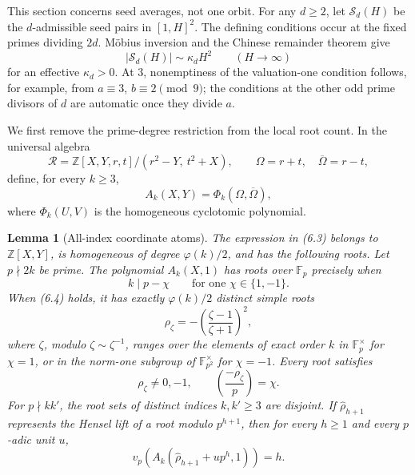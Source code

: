 \documentclass[11pt]{article}
\newtheorem{lemma}[theorem]{Lemma}
\theoremstyle{definition}
\theoremstyle{remark}
\newcommand{\Sset}{\mathcal S}
\begin{document}
This section concerns seed averages, not one orbit.  For any $d\ge2$,
let \(\Sset_d(H)\) be the $d$-admissible seed pairs in \([1,H]^2\).
The defining conditions occur at the fixed primes dividing $2d$.
Möbius inversion and the Chinese remainder theorem give
\[
 |\Sset_d(H)|\sim\kappa_dH^2
 \qquad(H\longrightarrow\infty)
 \tag{6.1}
\]
for an effective \(\kappa_d>0\).  At $3$, nonemptiness of the
valuation-one condition follows, for example, from
\(a\equiv3\), \(b\equiv2\pmod9\); the conditions at the other odd
prime divisors of $d$ are automatic once they divide $a$.

We first remove the prime-degree restriction from the local root count.
In the universal algebra
\[
 \mathcal R=\mathbb Z[X,Y,r,t]/(r^2-Y,\ t^2+X),
 \qquad
 \Omega=r+t,\quad\overline\Omega=r-t,
 \tag{6.2}
\]
define, for every $k\ge3$,
\[
 A_k(X,Y)=\Phi_k(\Omega,\overline\Omega),
 \tag{6.3}
\]
where \(\Phi_k(U,V)\) is the homogeneous cyclotomic polynomial.

\begin{lemma}[All-index coordinate atoms]\label{lem:all-index-atoms}
The expression in (6.3) belongs to \(\mathbb Z[X,Y]\), is homogeneous
of degree \(\varphi(k)/2\), and has the following roots.  Let
\(p\nmid2k\) be prime.  The polynomial \(A_k(X,1)\) has roots over
\(\mathbb F_p\) precisely when
\[
 k\mid p-\chi\qquad\text{for one }\chi\in\{1,-1\}.
 \tag{6.4}
\]
When (6.4) holds, it has exactly \(\varphi(k)/2\) distinct simple
roots
\[
 \rho_\zeta=-\left(\frac{\zeta-1}{\zeta+1}\right)^2,
 \tag{6.5}
\]
where \(\zeta\), modulo \(\zeta\sim\zeta^{-1}\), ranges over the
elements of exact order $k$ in \(\mathbb F_p^\times\) for \(\chi=1\),
or in the norm-one subgroup of \(\mathbb F_{p^2}^\times\) for
\(\chi=-1\).  Every root satisfies
\[
 \rho_\zeta\ne0,-1,
 \qquad
 \left(\frac{-\rho_\zeta}{p}\right)=\chi.
 \tag{6.6}
\]
For \(p\nmid kk'\), the root sets of distinct indices \(k,k'\ge3\)
are disjoint.  If \(\widehat\rho_{h+1}\) represents the Hensel lift
of a root modulo \(p^{h+1}\), then for every $h\ge1$ and every
$p$-adic unit $u$,
\[
 v_p\!\left(A_k(\widehat\rho_{h+1}+up^h,1)\right)=h.
 \tag{6.7}
\]
\end{lemma}
\end{document}

